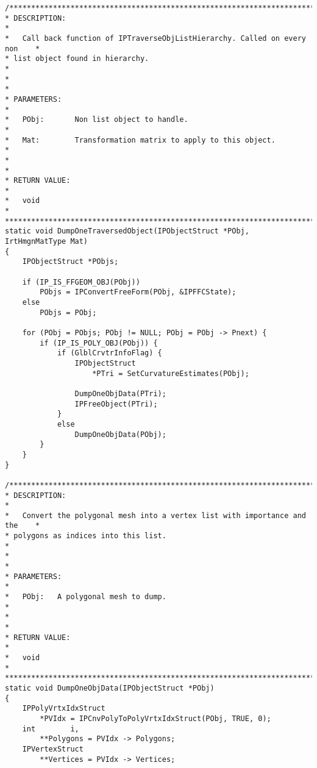 \begin{verbatim}
/*****************************************************************************
* DESCRIPTION:                                                               *
*   Call back function of IPTraverseObjListHierarchy. Called on every non    *
* list object found in hierarchy.                                            *
*                                                                            *
* PARAMETERS:                                                                *
*   PObj:       Non list object to handle.                                   *
*   Mat:        Transformation matrix to apply to this object.               *
*                                                                            *
* RETURN VALUE:                                                              *
*   void                                                                     *
*****************************************************************************/
static void DumpOneTraversedObject(IPObjectStruct *PObj, IrtHmgnMatType Mat)
{
    IPObjectStruct *PObjs;

    if (IP_IS_FFGEOM_OBJ(PObj))
        PObjs = IPConvertFreeForm(PObj, &IPFFCState);
    else
        PObjs = PObj;

    for (PObj = PObjs; PObj != NULL; PObj = PObj -> Pnext) {
        if (IP_IS_POLY_OBJ(PObj)) {
            if (GlblCrvtrInfoFlag) {
                IPObjectStruct
                    *PTri = SetCurvatureEstimates(PObj);

                DumpOneObjData(PTri);
                IPFreeObject(PTri);
            }
            else
                DumpOneObjData(PObj);
        }
    }
}

/*****************************************************************************
* DESCRIPTION:                                                               *
*   Convert the polygonal mesh into a vertex list with importance and the    *
* polygons as indices into this list.                                        *
*                                                                            *
* PARAMETERS:                                                                *
*   PObj:   A polygonal mesh to dump.                                        *
*                                                                            *
* RETURN VALUE:                                                              *
*   void                                                                     *
*****************************************************************************/
static void DumpOneObjData(IPObjectStruct *PObj)
{
    IPPolyVrtxIdxStruct
        *PVIdx = IPCnvPolyToPolyVrtxIdxStruct(PObj, TRUE, 0);
    int        i,
        **Polygons = PVIdx -> Polygons;
    IPVertexStruct
        **Vertices = PVIdx -> Vertices;


\end{verbatim}
